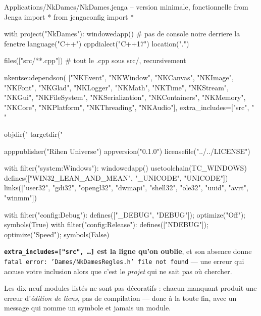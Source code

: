 \begin{nkcode}{Applications/NkDames/NkDames.jenga -- version minimale, fonctionnelle}
from Jenga import *
from jengaconfig import *

with project("NkDames"):
    windowedapp()                 # pas de console noire derriere la fenetre
    language("C++")
    cppdialect("C++17")
    location(".")

    files(["src/**.cpp"])         # tout le .cpp sous src/, recursivement

    nkentseudependson(
        ["NKEvent", "NKWindow", "NKCanvas", "NKImage", "NKFont", "NKGlad",
         "NKLogger", "NKMath", "NKTime", "NKStream", "NKGui", "NKFileSystem",
         "NKSerialization", "NKContainers", "NKMemory", "NKCore",
         "NKPlatform", "NKThreading", "NKAudio"],
        extra_includes=["src", "%
                        "%

    objdir("%
    targetdir("%

    apppublisher("Rihen Universe")
    appversion("0.1.0")
    licensefile("../../LICENSE")

    with filter("system:Windows"):
        windowedapp()
        usetoolchain(TC_WINDOWS)
        defines(["WIN32_LEAN_AND_MEAN", "_UNICODE", "UNICODE"])
        links(["user32", "gdi32", "opengl32", "dwmapi", "shell32",
               "ole32", "uuid", "avrt", "winmm"])

    with filter("config:Debug"):
        defines(["_DEBUG", "DEBUG"]); optimize("Off");   symbols(True)
    with filter("config:Release"):
        defines(["NDEBUG"]);          optimize("Speed"); symbols(False)
\end{nkcode}

\begin{nkretenir}
\textbf{\texttt{extra\_includes=["src", \dots]} est la ligne qu'on oublie}, et
son absence donne \texttt{fatal error: 'Dames/NkDamesRegles.h' file not found}
--- une erreur qui accuse votre inclusion alors que c'est le \emph{projet} qui
ne sait pas où chercher.

Les dix-neuf modules listés ne sont pas décoratifs : chacun manquant produit une
erreur d'\emph{édition de liens}, pas de compilation --- donc à la toute fin,
avec un message qui nomme un symbole et jamais un module.
\end{nkretenir}

